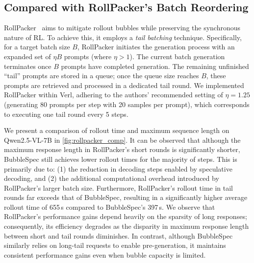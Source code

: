 \subsection{Compared with RollPacker’s Batch Reordering} 
RollPacker~\cite{gao2025rollpacker} aims to mitigate rollout bubbles while preserving the synchronous nature of RL. To achieve this, it employs a \textit{tail batching} technique. Specifically, for a target batch size $B$, RollPacker initiates the generation process with an expanded set of $\eta B$ prompts (where $\eta > 1$).
The current batch generation terminates once $B$ prompts have completed generation. The remaining unfinished ``tail'' prompts are stored in a queue; once the queue size reaches $B$, these prompts are retrieved and processed in a dedicated tail round. 
We implemented RollPacker within Verl, adhering to the authors' recommended setting of $\eta=1.25$ (\ie generating 80 prompts per step with 20 samples per prompt), which corresponds to executing one tail round every 5 steps.

We present a comparison of rollout time and maximum sequence length on Qwen2.5-VL-7B in \autoref{fig:rollpacker_comp}. It can be observed that although the maximum response length in RollPacker's short rounds is significantly shorter, BubbleSpec still achieves lower rollout times for the majority of steps. 
This is primarily due to: (1) the reduction in decoding steps enabled by speculative decoding, and (2) the additional computational overhead introduced by RollPacker's larger batch size. Furthermore, RollPacker's rollout time in tail rounds far exceeds that of BubbleSpec, resulting in a significantly higher average rollout time of 655\,s compared to BubbleSpec's 397\,s. 
We observe that RollPacker's performance gains depend heavily on the sparsity of long responses; consequently, its efficiency degrades as the disparity in maximum response length between short and tail rounds diminishes. In contrast, although BubbleSpec similarly relies on long-tail requests to enable pre-generation, it maintains consistent performance gains even when bubble capacity is limited.






